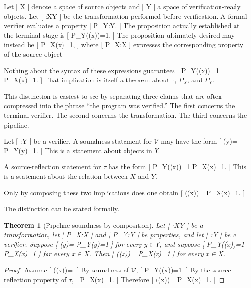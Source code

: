 \documentclass[11pt]{article}
\newtheorem{theorem}{Theorem} \newtheorem{proposition}{Proposition} \newtheorem{lemma}{Lemma} \newtheorem{corollary}{Corollary} \newtheorem{definition}{Definition} \newtheorem{remark}{Remark}
\begin{document}
Let
[
X
]
denote a space of source objects and
[
Y
]
a space of verification-ready objects. Let
[
\tau:X\rightarrow Y
]
be the transformation performed before verification. A formal verifier evaluates a property
[
P_Y:Y.
]
The proposition actually established at the terminal stage is
[
P_Y(\tau(x))=1.
]
The proposition ultimately desired may instead be
[
P_X(x)=1,
]
where
[
P_X:X
]
expresses the corresponding property of the source object.

Nothing about the syntax of these expressions guarantees
[
P_Y(\tau(x))=1
\Longrightarrow
P_X(x)=1.
]
That implication is itself a theorem about $\tau$, $P_X$, and $P_Y$.

This distinction is easiest to see by separating three claims that are often compressed into the phrase ``the program was verified.'' The first concerns the terminal verifier. The second concerns the transformation. The third concerns the pipeline.

Let
[
:Y
]
be a verifier. A soundness statement for $\mathcal{V}$ may have the form
[
(y)=
\Longrightarrow
P_Y(y)=1.
]
This is a statement about objects in $Y$.

A source-reflection statement for $\tau$ has the form
[
P_Y(\tau(x))=1
\Longrightarrow
P_X(x)=1.
]
This is a statement about the relation between $X$ and $Y$.

Only by composing these two implications does one obtain
[
(\tau(x))=
\Longrightarrow
P_X(x)=1.
]

The distinction can be stated formally.

\begin{theorem}[Pipeline soundness by composition]
Let
[
\tau:X\rightarrow Y
]
be a transformation, let
[
P_X:X
]
and
[
P_Y:Y
]
be properties, and let
[
:Y
]
be a verifier. Suppose
[
(y)=
\Longrightarrow
P_Y(y)=1
]
for every $y\in Y$, and suppose
[
P_Y(\tau(x))=1
\Longrightarrow
P_X(x)=1
]
for every $x\in X$. Then
[
(\tau(x))=
\Longrightarrow
P_X(x)=1
]
for every $x\in X$.
\end{theorem}

\begin{proof}
Assume
[
(\tau(x))=.
]
By soundness of $\mathcal{V}$,
[
P_Y(\tau(x))=1.
]
By the source-reflection property of $\tau$,
[
P_X(x)=1.
]
Therefore
[
(\tau(x))=
\Longrightarrow
P_X(x)=1.
]
\end{proof}
\end{document}
